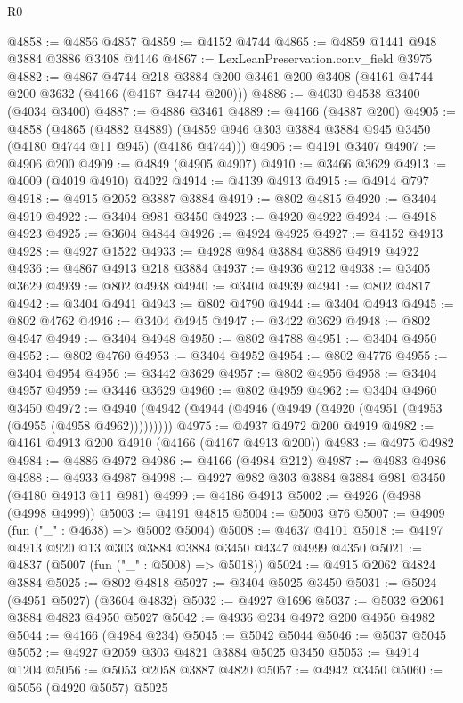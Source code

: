 \begin{lexlean}{R0}
\begin{coremodule}
@4858 := @4856 @4857
@4859 := @4152 @4744
@4865 := @4859 @1441 @948 @3884 @3886 @3408 @4146
@4867 := LexLeanPreservation.conv_field @3975
@4882 := @4867
    @4744
    @218
    @3884
    @200
    @3461
    @200
    @3408
    (@4161 @4744 @200 @3632 (@4166 (@4167 @4744 @200)))
@4886 := @4030 @4538 @3400 (@4034 @3400)
@4887 := @4886 @3461
@4889 := @4166 (@4887 @200)
@4905 := @4858
    (@4865
      (@4882 @4889)
      (@4859 @946 @303 @3884 @3884 @945 @3450 (@4180 @4744 @11 @945) (@4186 @4744)))
@4906 := @4191 @3407
@4907 := @4906 @200
@4909 := @4849 (@4905 @4907)
@4910 := @3466 @3629
@4913 := @4009 (@4019 @4910) @4022
@4914 := @4139 @4913
@4915 := @4914 @797
@4918 := @4915 @2052 @3887 @3884
@4919 := @802 @4815
@4920 := @3404 @4919
@4922 := @3404 @981 @3450
@4923 := @4920 @4922
@4924 := @4918 @4923
@4925 := @3604 @4844
@4926 := @4924 @4925
@4927 := @4152 @4913
@4928 := @4927 @1522
@4933 := @4928 @984 @3884 @3886 @4919 @4922
@4936 := @4867 @4913 @218 @3884
@4937 := @4936 @212
@4938 := @3405 @3629
@4939 := @802 @4938
@4940 := @3404 @4939
@4941 := @802 @4817
@4942 := @3404 @4941
@4943 := @802 @4790
@4944 := @3404 @4943
@4945 := @802 @4762
@4946 := @3404 @4945
@4947 := @3422 @3629
@4948 := @802 @4947
@4949 := @3404 @4948
@4950 := @802 @4788
@4951 := @3404 @4950
@4952 := @802 @4760
@4953 := @3404 @4952
@4954 := @802 @4776
@4955 := @3404 @4954
@4956 := @3442 @3629
@4957 := @802 @4956
@4958 := @3404 @4957
@4959 := @3446 @3629
@4960 := @802 @4959
@4962 := @3404 @4960 @3450
@4972 := @4940 (@4942 (@4944 (@4946 (@4949 (@4920 (@4951 (@4953 (@4955 (@4958 @4962)))))))))
@4975 := @4937 @4972 @200 @4919
@4982 := @4161 @4913 @200 @4910 (@4166 (@4167 @4913 @200))
@4983 := @4975 @4982
@4984 := @4886 @4972
@4986 := @4166 (@4984 @212)
@4987 := @4983 @4986
@4988 := @4933 @4987
@4998 := @4927 @982 @303 @3884 @3884 @981 @3450 (@4180 @4913 @11 @981)
@4999 := @4186 @4913
@5002 := @4926 (@4988 (@4998 @4999))
@5003 := @4191 @4815
@5004 := @5003 @76
@5007 := @4909 (fun ("_" : @4638) => @5002 @5004)
@5008 := @4637 @4101
@5018 := @4197 @4913 @920 @13 @303 @3884 @3884 @3450 @4347 @4999 @4350
@5021 := @4837 (@5007 (fun ("_" : @5008) => @5018))
@5024 := @4915 @2062 @4824 @3884
@5025 := @802 @4818
@5027 := @3404 @5025 @3450
@5031 := @5024 (@4951 @5027) (@3604 @4832)
@5032 := @4927 @1696
@5037 := @5032 @2061 @3884 @4823 @4950 @5027
@5042 := @4936 @234 @4972 @200 @4950 @4982
@5044 := @4166 (@4984 @234)
@5045 := @5042 @5044
@5046 := @5037 @5045
@5052 := @4927 @2059 @303 @4821 @3884 @5025 @3450
@5053 := @4914 @1204
@5056 := @5053 @2058 @3887 @4820
@5057 := @4942 @3450
@5060 := @5056 (@4920 @5057) @5025

\end{coremodule}
\end{lexlean}

